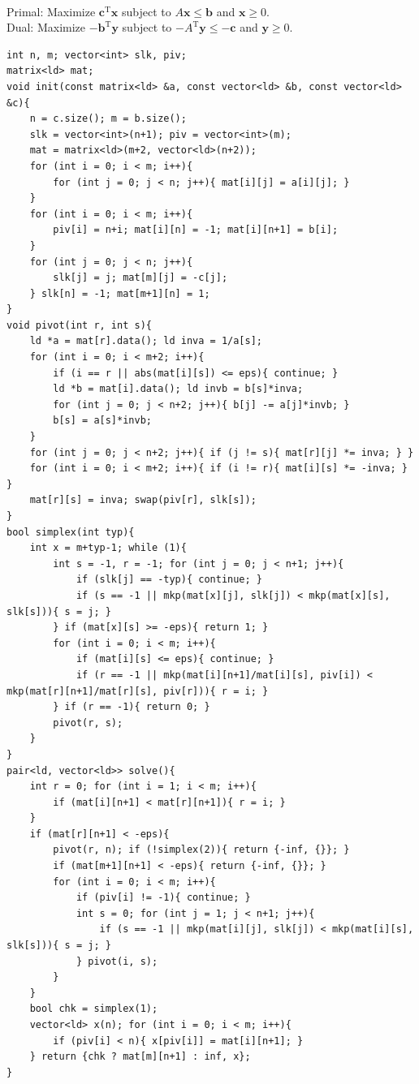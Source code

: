  \\
Primal: Maximize $\mathbf{c}^\mathrm{T} \mathbf{x}$ subject to $A \mathbf{x} \le \mathbf{b}$ and $\mathbf{x} \ge 0$. \\
Dual: Maximize $-\mathbf{b}^\mathrm{T} \mathbf{y}$ subject to $-A^\mathrm{T} \mathbf{y} \le -\mathbf{c}$ and $\mathbf{y} \ge 0$.

\begin{verbatim}
int n, m; vector<int> slk, piv;
matrix<ld> mat;
void init(const matrix<ld> &a, const vector<ld> &b, const vector<ld> &c){
	n = c.size(); m = b.size();
	slk = vector<int>(n+1); piv = vector<int>(m);
	mat = matrix<ld>(m+2, vector<ld>(n+2));
	for (int i = 0; i < m; i++){
		for (int j = 0; j < n; j++){ mat[i][j] = a[i][j]; }
	}
	for (int i = 0; i < m; i++){
		piv[i] = n+i; mat[i][n] = -1; mat[i][n+1] = b[i];
	}
	for (int j = 0; j < n; j++){
		slk[j] = j; mat[m][j] = -c[j];
	} slk[n] = -1; mat[m+1][n] = 1;
}
void pivot(int r, int s){
	ld *a = mat[r].data(); ld inva = 1/a[s];
	for (int i = 0; i < m+2; i++){
		if (i == r || abs(mat[i][s]) <= eps){ continue; }
		ld *b = mat[i].data(); ld invb = b[s]*inva;
		for (int j = 0; j < n+2; j++){ b[j] -= a[j]*invb; }
		b[s] = a[s]*invb;
	}
	for (int j = 0; j < n+2; j++){ if (j != s){ mat[r][j] *= inva; } }
	for (int i = 0; i < m+2; i++){ if (i != r){ mat[i][s] *= -inva; } }
	mat[r][s] = inva; swap(piv[r], slk[s]);
}
bool simplex(int typ){
	int x = m+typ-1; while (1){
		int s = -1, r = -1; for (int j = 0; j < n+1; j++){
			if (slk[j] == -typ){ continue; }
			if (s == -1 || mkp(mat[x][j], slk[j]) < mkp(mat[x][s], slk[s])){ s = j; }
		} if (mat[x][s] >= -eps){ return 1; }
		for (int i = 0; i < m; i++){
			if (mat[i][s] <= eps){ continue; }
			if (r == -1 || mkp(mat[i][n+1]/mat[i][s], piv[i]) < mkp(mat[r][n+1]/mat[r][s], piv[r])){ r = i; }
		} if (r == -1){ return 0; }
		pivot(r, s);
	}
}
pair<ld, vector<ld>> solve(){
	int r = 0; for (int i = 1; i < m; i++){
		if (mat[i][n+1] < mat[r][n+1]){ r = i; }
	}
	if (mat[r][n+1] < -eps){
		pivot(r, n); if (!simplex(2)){ return {-inf, {}}; }
		if (mat[m+1][n+1] < -eps){ return {-inf, {}}; }
		for (int i = 0; i < m; i++){
			if (piv[i] != -1){ continue; }
			int s = 0; for (int j = 1; j < n+1; j++){
				if (s == -1 || mkp(mat[i][j], slk[j]) < mkp(mat[i][s], slk[s])){ s = j; }
			} pivot(i, s);
		}
	}
	bool chk = simplex(1);
	vector<ld> x(n); for (int i = 0; i < m; i++){
		if (piv[i] < n){ x[piv[i]] = mat[i][n+1]; }
	} return {chk ? mat[m][n+1] : inf, x};
}
\end{verbatim}